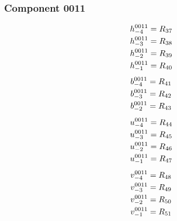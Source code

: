 \documentclass[11pt,a4paper]{article}
\begin{document}
\subsubsection{Component 0011}
\begin{equation}
\shortstack[l]{$\displaystyle h^{0011}_{-4}=R_{37}$\\
$\displaystyle h^{0011}_{-3}=R_{38}$\\
$\displaystyle h^{0011}_{-2}=R_{39}$\\
$\displaystyle h^{0011}_{-1}=R_{40}$}
\label{eq:cat-map-10}
\end{equation}
\begin{equation}
\shortstack[l]{$\displaystyle b^{0011}_{-4}=R_{41}$\\
$\displaystyle b^{0011}_{-3}=R_{42}$\\
$\displaystyle b^{0011}_{-2}=R_{43}$}
\label{eq:cat-map-11}
\end{equation}
\begin{equation}
\shortstack[l]{$\displaystyle u^{0011}_{-4}=R_{44}$\\
$\displaystyle u^{0011}_{-3}=R_{45}$\\
$\displaystyle u^{0011}_{-2}=R_{46}$\\
$\displaystyle u^{0011}_{-1}=R_{47}$}
\label{eq:cat-map-12}
\end{equation}
\begin{equation}
\shortstack[l]{$\displaystyle v^{0011}_{-4}=R_{48}$\\
$\displaystyle v^{0011}_{-3}=R_{49}$\\
$\displaystyle v^{0011}_{-2}=R_{50}$\\
$\displaystyle v^{0011}_{-1}=R_{51}$}
\label{eq:cat-map-13}
\end{equation}
\end{document}
